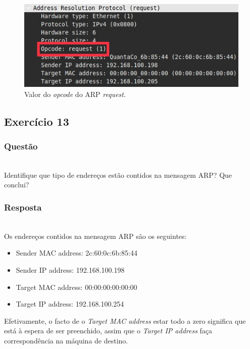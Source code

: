 \documentclass{llncs}
\begin{document}
\begin{figure}
  \begin{center}
	  \includegraphics[scale=0.6]{./imagens/arp_request_opcode.png} 
  \end{center}
	\caption{Valor do \textit{opcode} do ARP \textit{request}.}
  \label{fig:arp_request_opcode}
\end{figure} 


\clearpage
\subsection{Exercício 13}
\subsubsection{Questão}\rule[-10pt]{0pt}{10pt}\\

Identifique que tipo de endereços estão contidos na mensagem ARP? Que conclui?

\subsubsection{Resposta}\rule[-10pt]{0pt}{10pt}\\

Os endereços contidos na mensagem ARP são os seguintes:

\begin{itemize}
	\item Sender MAC address: 2c:60:0c:6b:85:44

	\item Sender IP address: 192.168.100.198

	\item Target MAC address: 00:00:00:00:00:00 

	\item Target IP address: 192.168.100.254
\end{itemize}

Efetivamente, o facto de o \textit{Target MAC address} estar todo a zero significa que está à espera de ser preenchido, assim que o \textit{Target IP address} faça correspondência na máquina de destino.
\end{document}
